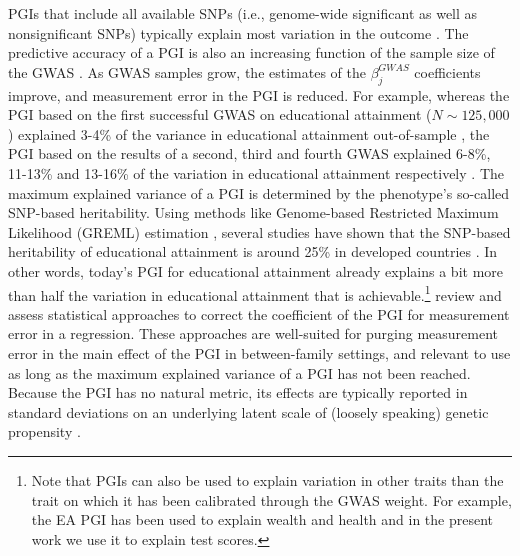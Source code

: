 \documentclass[12pt,a4paper]{article}
\begin{document}
\begin{bibunit}
PGIs that include all available SNPs (i.e., genome-wide significant as well as nonsignificant SNPs) typically explain most variation in the outcome \citep{Ware2017}. The predictive accuracy of a PGI is also an increasing function of the sample size of the GWAS \citep{dudbridge2013power}. As GWAS samples grow, the estimates of the $\beta_j^{GWAS}$ coefficients improve, and measurement error in the PGI is reduced. For example, whereas the PGI based on the first successful GWAS on educational attainment ($N \sim 125,000$) explained 3-4\% of the variance in educational attainment out-of-sample \citep{Rietveld2014}, the PGI based on the results of a second, third and fourth GWAS explained 6-8\%, 11-13\% and 13-16\% of the variation in educational attainment respectively \citep{okbay2016, lee2018gene, Okbay2022}. The maximum explained variance of a PGI is determined by the phenotype's so-called SNP-based heritability. Using methods like Genome-based Restricted Maximum Likelihood (GREML) estimation \citep{Yang2011}, several studies have shown that the SNP-based heritability of educational attainment is around 25\% in developed countries \citep{Rietveld2013}. In other words, today's PGI for educational attainment already explains a bit more than half the variation in educational attainment that is achievable.\footnote{Note that PGIs can also be used to explain variation in other traits than the trait on which it has been calibrated through the GWAS weight. For example, the EA PGI has been used to explain wealth \citep{papageorge2020genes} and health \citep{bolyard2024understanding} and in the present work we use it to explain test scores.} \cite{VanKippersluis2020} review and assess statistical approaches to correct the coefficient of the PGI for measurement error in a regression. These approaches are well-suited for purging measurement error in the main effect of the PGI in between-family settings, and relevant to use as long as the maximum explained variance of a PGI has not been reached. Because the PGI has no natural metric, its effects are typically reported in standard deviations on an underlying latent scale of (loosely speaking) genetic propensity \citep{Becker2021}.


\end{bibunit}
\end{document}
